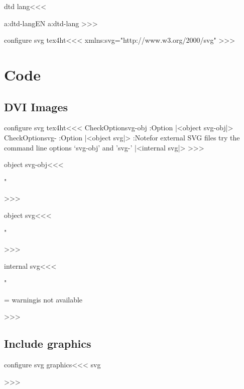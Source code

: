 \<dtd lang\><<<
\expandafter
\ifx \csname a:dtd-lang\endcsname\relax EN\else
  \csname a:dtd-lang\endcsname
\fi
>>>

\<configure svg tex4ht\><<<    
  {\Hnewline xmlns:svg="http://www.w3.org/2000/svg"\Hnewline }
>>>



\chapter{Code}

\section{DVI Images}





\<configure svg tex4ht\><<<    
\:CheckOption{svg-obj} \if:Option 
   |<object svg-obj|>
\else   \:CheckOption{svg-} \if:Option 
      |<object svg|>
\else 
      \Log:Note{for external SVG files
             try the command line options `svg-obj' and 'svg-'}
      |<internal svg|>
\fi\fi
>>>



\<object svg-obj\><<<
  {}
  {}
  {" }
  {}
  {}
>>>





\<object svg\><<<
  {}
  {}
  {" }
  {}
  {}
>>>


\<internal svg\><<<
  {}
  {}
  {" }
  {}
  {%
   =\PictureFile \relax
     \:warning{\PictureFile\space is not available}%
   \else     {}  \fi
  }
>>>




\section{Include graphics}

\<configure svg graphics\><<<
   {svg} 
   {{\Needs{}}%
     }
>>>

